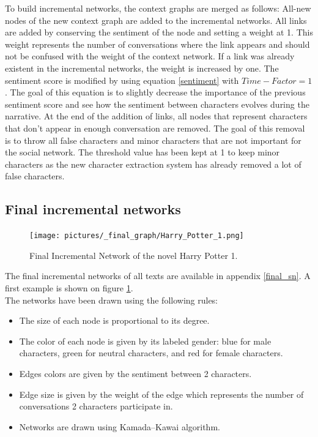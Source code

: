\documentclass[a4paper, 12pt]{report}
\begin{document}
To build incremental networks, the context graphs are merged as follows: All-new nodes of the new context graph are added to the incremental networks.
All links are added by conserving the sentiment of the node and setting a weight at 1. This weight represents the number of conversations where the link appears and should not be confused with the weight of the context network. If a link was already existent in the incremental networks, the weight is increased by one.
The sentiment score is modified by using equation \ref{sentiment} with $Time-Factor = 1$.
The goal of this equation is to slightly decrease the importance of the previous sentiment score and see how the sentiment between characters evolves during the narrative.
At the end of the addition of links, all nodes that represent characters that don't appear in enough conversation are removed. The goal of this removal is to throw all false characters and minor characters that are not important for the social network. The threshold value has been kept at 1 to keep minor characters as the new character extraction system has already removed a lot of false characters.\\

\subsection{Final incremental networks}

\begin{figure}
\centering
\texttt{[image: pictures/\_final\_graph/Harry\_Potter\_1.png]}
\caption{Final Incremental Network of the novel Harry Potter 1.}
\label{sn_harry}
\end{figure}

The final incremental networks of all texts are available in appendix \ref{final_sn}. A first example is shown on figure \ref{sn_harry}.\\
The networks have been drawn using the following rules:
\begin{itemize}
\item The size of each node is proportional to its degree.
\item The color of each node is given by its labeled gender: blue for male characters, green for neutral characters, and red for female characters.
\item Edges colors are given by the sentiment between 2 characters.
\item Edge size is given by the weight of the edge which represents the number of conversations 2 characters participate in.
\item Networks are drawn using Kamada–Kawai algorithm.
\end{itemize}
\end{document}
